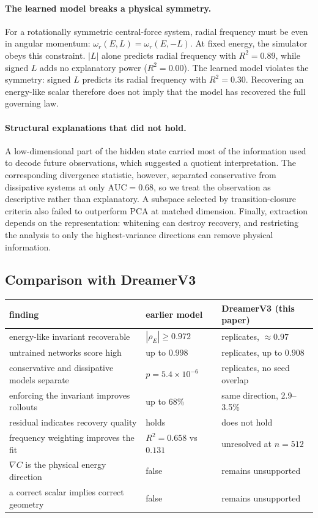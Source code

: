 \paragraph{The learned model breaks a physical symmetry.} For a rotationally symmetric central-force
system, radial frequency must be even in angular momentum: $\omega_r(E,L) = \omega_r(E,-L)$. At fixed
energy, the simulator obeys this constraint. $|L|$ alone predicts radial frequency with
$R^2 = 0.89$, while signed $L$ adds no explanatory power ($R^2 = 0.00$). The learned model violates
the symmetry: signed $L$ predicts its radial frequency with $R^2 = 0.30$. Recovering an energy-like
scalar therefore does not imply that the model has recovered the full governing law.

\paragraph{Structural explanations that did not hold.} A low-dimensional part of the hidden state
carried most of the information used to decode future observations, which suggested a quotient
interpretation. The corresponding divergence statistic, however, separated conservative from
dissipative systems at only $\mathrm{AUC} = 0.68$, so we treat the observation as descriptive rather
than explanatory. A subspace selected by transition-closure criteria also failed to outperform PCA at
matched dimension. Finally, extraction depends on the representation: whitening can destroy recovery,
and restricting the analysis to only the highest-variance directions can remove physical information.

\subsection{Comparison with DreamerV3}

\begin{center}\small
\begin{tabular}{lll}
\toprule
finding & earlier model & DreamerV3 (this paper) \\
\midrule
energy-like invariant recoverable & $|\rho_E| \ge 0.972$ & replicates, $\approx 0.97$ \\
untrained networks score high & up to $0.998$ & replicates, up to $0.908$ \\
conservative and dissipative models separate & $p = 5.4\times10^{-6}$ & replicates, no seed overlap \\
enforcing the invariant improves rollouts & up to 68\% & same direction, 2.9--3.5\% \\
residual indicates recovery quality & holds & does not hold \\
frequency weighting improves the fit & $R^2 = 0.658$ vs $0.131$ & unresolved at $n = 512$ \\
$\nabla C$ is the physical energy direction & false & remains unsupported \\
a correct scalar implies correct geometry & false & remains unsupported \\
\bottomrule
\end{tabular}
\end{center}

